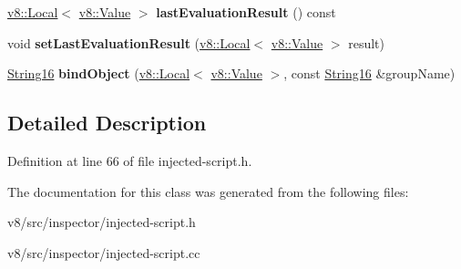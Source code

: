 \begin{DoxyCompactItemize}
\item 
\mbox{\label{classv8__inspector_1_1InjectedScript_a17be7d8fa6ca6f3183e78e6568944c3e}} 
\mbox{\hyperlink{classv8_1_1Local}{v8\+::\+Local}}$<$ \mbox{\hyperlink{classv8_1_1Value}{v8\+::\+Value}} $>$ {\bfseries last\+Evaluation\+Result} () const
\item 
\mbox{\label{classv8__inspector_1_1InjectedScript_a2d9fd1c98aa26d60b65e278da1877cba}} 
void {\bfseries set\+Last\+Evaluation\+Result} (\mbox{\hyperlink{classv8_1_1Local}{v8\+::\+Local}}$<$ \mbox{\hyperlink{classv8_1_1Value}{v8\+::\+Value}} $>$ result)
\item 
\mbox{\label{classv8__inspector_1_1InjectedScript_a5063206ac9fb6b349c19b13058a5dc9b}} 
\mbox{\hyperlink{classv8__inspector_1_1String16}{String16}} {\bfseries bind\+Object} (\mbox{\hyperlink{classv8_1_1Local}{v8\+::\+Local}}$<$ \mbox{\hyperlink{classv8_1_1Value}{v8\+::\+Value}} $>$, const \mbox{\hyperlink{classv8__inspector_1_1String16}{String16}} \&group\+Name)
\end{DoxyCompactItemize}


\subsection{Detailed Description}


Definition at line 66 of file injected-\/script.\+h.



The documentation for this class was generated from the following files\+:\begin{DoxyCompactItemize}
\item 
v8/src/inspector/injected-\/script.\+h\item 
v8/src/inspector/injected-\/script.\+cc\end{DoxyCompactItemize}
